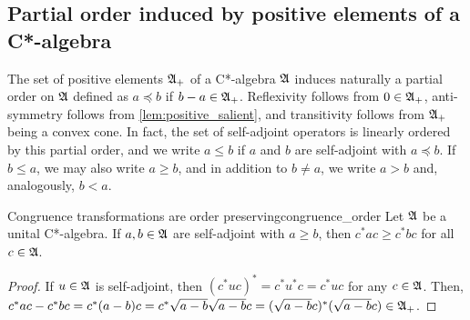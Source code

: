
\subsection{Partial order induced by positive elements of a C*-algebra}
The set of positive elements \(\mathfrak{A}_+\) of a C*-algebra \(\mathfrak{A}\) induces naturally a partial order on \(\mathfrak{A}\) defined as \(a \preceq b\) if \(b - a \in \mathfrak{A}_+\). Reflexivity follows from \(0 \in \mathfrak{A}_+\), anti-symmetry follows from \cref{lem:positive_salient}, and transitivity follows from \(\mathfrak{A}_+\) being a convex cone. In fact, the set of self-adjoint operators is linearly ordered by this partial order, and we write \(a \leq b\) if \(a\) and \(b\) are self-adjoint with \(a \preceq b\). If \(b \leq a\), we may also write \(a \geq b\), and in addition to \(b \neq a\), we write \(a > b\) and, analogously, \(b < a\).

\begin{proposition}{Congruence transformations are order preserving}{congruence_order}
    Let \(\mathfrak{A}\) be a unital C*-algebra. If \(a,b \in \mathfrak{A}\) are self-adjoint with \(a \geq b\), then \(c^*ac \geq c^* b c\) for all \(c \in \mathfrak{A}\).
\end{proposition}
\begin{proof}
    If \(u\in \mathfrak{A}\) is self-adjoint, then \((c^*uc)^* = c^* u^* c = c^* u c\) for any \(c \in \mathfrak{A}\). Then, \(c^*ac - c^*bc = c^*(a - b)c = c^*\sqrt{a - b} \sqrt{a - b}c = (\sqrt{a - b} c)^* (\sqrt{a - b}c) \in \mathfrak{A}_+\).
\end{proof}

